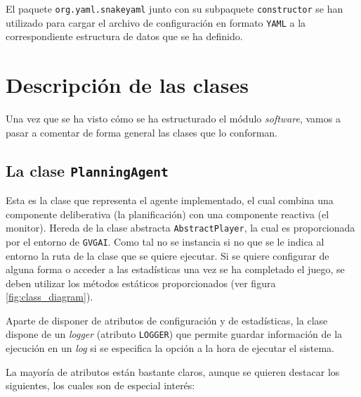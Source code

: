 El paquete \texttt{org.yaml.snakeyaml} junto con su subpaquete \texttt{constructor} se han
utilizado para cargar el archivo de configuración en formato \texttt{YAML} a la correspondiente
estructura de datos que se ha definido.

\section{Descripción de las clases}

Una vez que se ha visto cómo se ha estructurado el módulo \textit{software}, vamos
a pasar a comentar de forma general las clases que lo conforman.

\subsection{La clase \texttt{PlanningAgent}}

Esta es la clase que representa el agente implementado, el cual combina una componente deliberativa
(la planificación) con una componente reactiva (el monitor). Hereda de la clase abstracta
\texttt{AbstractPlayer}, la cual es proporcionada por el entorno de \texttt{GVGAI}. Como
tal no se instancia si no que se le indica al entorno la ruta de la clase que se quiere ejecutar.
Si se quiere configurar de alguna forma o acceder a las estadísticas una vez se ha completado
el juego, se deben utilizar los métodos estáticos proporcionados (ver figura \ref{fig:class_diagram}).

Aparte de disponer de atributos de configuración y de estadísticas, la clase dispone de un \textit{logger}
(atributo \texttt{LOGGER}) que permite guardar información de la ejecución en un \textit{log} si
se especifica la opción a la hora de ejecutar el sistema.

La mayoría de atributos están bastante claros, aunque se quieren destacar los siguientes, los cuales
son de especial interés:

